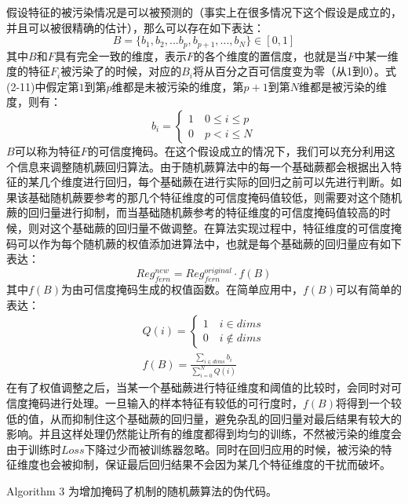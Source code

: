 假设特征的被污染情况是可以被预测的（事实上在很多情况下这个假设是成立的，并且可以被很精确的估计），那么可以存在如下表达：
\begin{equation}
	B=\{b_1,b_2,...b_p,b_{p+1},...,b_N\}\in[0,1]
\end{equation}
其中$B$和$F$具有完全一致的维度，表示$F$的各个维度的置信度，也就是当$F$中某一维度的特征$F_i$被污染了的时候，对应的$B_i$将从百分之百可信度变为零（从1到0）。式(2-11)中假定第$1$到第$p$维都是未被污染的维度，第$p+1$到第$N$维都是被污染的维度，则有：
\begin{equation}
b_i=
\begin{cases}
1\quad {0\leq i\leq p} \\
0\quad {p<i\leq N}
\end{cases}
\end{equation}
$B$可以称为特征$F$的可信度掩码。在这个假设成立的情况下，我们可以充分利用这个信息来调整随机蕨回归算法。由于随机蕨算法中的每一个基础蕨都会根据出入特征的某几个维度进行回归，每个基础蕨在进行实际的回归之前可以先进行判断。如果该基础随机蕨要参考的那几个特征维度的可信度掩码值较低，则需要对这个随机蕨的回归量进行抑制，而当基础随机蕨参考的特征维度的可信度掩码值较高的时候，则对这个基础蕨的回归量不做调整。在算法实现过程中，特征维度的可信度掩码可以作为每个随机蕨的权值添加进算法中，也就是每个基础蕨的回归量应有如下表达：
\begin{equation}
	Reg_{fern}^{new} = Reg_{fern}^{original}\cdot f(B)
\end{equation}
其中$f(B)$为由可信度掩码生成的权值函数。在简单应用中，$f(B)$可以有简单的表达：
\begin{equation}
\begin{aligned}
	Q(i)=
	\begin{cases}
		1\quad i\in dims \\
		0\quad i\not\in dims
	\end{cases} \\
	f(B)=\frac{\sum_{i\in dims} b_i}{\sum_{i=0}^{N} Q(i)}
\end{aligned}
\end{equation}
在有了权值调整之后，当某一个基础蕨进行特征维度和阈值的比较时，会同时对可信度掩码进行处理。一旦输入的样本特征有较低的可行度时，$f(B)$将得到一个较低的值，从而抑制住这个基础蕨的回归量，避免杂乱的回归量对最后结果有较大的影响。并且这样处理仍然能让所有的维度都得到均匀的训练，不然被污染的维度会由于训练时$Loss$下降过少而被训练器忽略。同时在回归应用的时候，被污染的特征维度也会被抑制，保证最后回归结果不会因为某几个特征维度的干扰而破坏。

Algorithm 3 为增加掩码了机制的随机蕨算法的伪代码。


